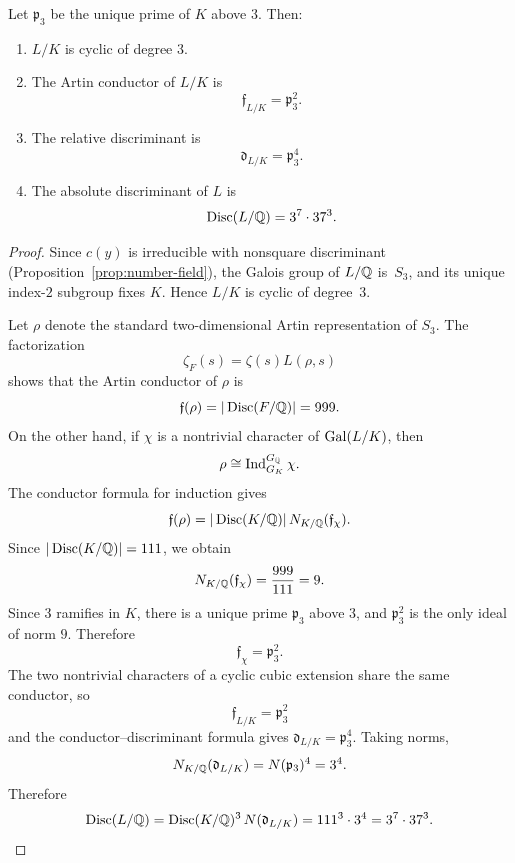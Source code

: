 \begin{theorem}\label{thm:conductor}
Let \(\mathfrak p_3\) be the unique prime of \(K\) above \(3\). Then:
\begin{enumerate}
\item[(i)] \(L/K\) is cyclic of degree \(3\).
\item[(ii)] The Artin conductor of \(L/K\) is
\[
\mathfrak f_{L/K}=\mathfrak p_3^2.
\]
\item[(iii)] The relative discriminant is
\[
\mathfrak d_{L/K}=\mathfrak p_3^4.
\]
\item[(iv)] The absolute discriminant of \(L\) is
\[
\operatorname{Disc}(L/\mathbb{Q})=3^7\cdot 37^3.
\]
\end{enumerate}
\end{theorem}

\begin{proof}
Since \(c(y)\) is irreducible with nonsquare discriminant (Proposition~\ref{prop:number-field}), the Galois group of \(L/\mathbb{Q}\) is~\(S_3\), and its unique index-\(2\) subgroup fixes \(K\). Hence \(L/K\) is cyclic of degree~\(3\).

Let \(\rho\) denote the standard two-dimensional Artin representation of \(S_3\). The factorization
\[
\zeta_F(s)=\zeta(s)L(\rho,s)
\]
shows that the Artin conductor of \(\rho\) is
\[
\mathfrak f(\rho)=|\operatorname{Disc}(F/\mathbb{Q})|=999.
\]
On the other hand, if \(\chi\) is a nontrivial character of \(\operatorname{Gal}(L/K)\), then
\[
\rho\cong \operatorname{Ind}_{G_K}^{G_{\mathbb{Q}}}\chi.
\]
The conductor formula for induction gives \cite[Ch.~VII]{Neukirch1999}
\[
\mathfrak f(\rho)=|\operatorname{Disc}(K/\mathbb{Q})|\,N_{K/\mathbb{Q}}(\mathfrak f_\chi).
\]
Since \(|\operatorname{Disc}(K/\mathbb{Q})|=111\), we obtain
\[
N_{K/\mathbb{Q}}(\mathfrak f_\chi)=\frac{999}{111}=9.
\]
Since \(3\) ramifies in \(K\), there is a unique prime \(\mathfrak p_3\) above \(3\), and \(\mathfrak p_3^2\) is the only ideal of norm \(9\). Therefore
\[
\mathfrak f_\chi=\mathfrak p_3^2.
\]
The two nontrivial characters of a cyclic cubic extension share the same conductor, so
\[
\mathfrak f_{L/K}=\mathfrak p_3^2
\]
and the conductor--discriminant formula \cite[Ch.~VII]{Neukirch1999} gives \(\mathfrak d_{L/K}=\mathfrak p_3^4\). Taking norms,
\[
N_{K/\mathbb{Q}}(\mathfrak d_{L/K})=N(\mathfrak p_3)^4=3^4.
\]
Therefore
\[
\operatorname{Disc}(L/\mathbb{Q})=\operatorname{Disc}(K/\mathbb{Q})^3\,N(\mathfrak d_{L/K})
=111^3\cdot 3^4
=3^7\cdot 37^3.
\]
\end{proof}


